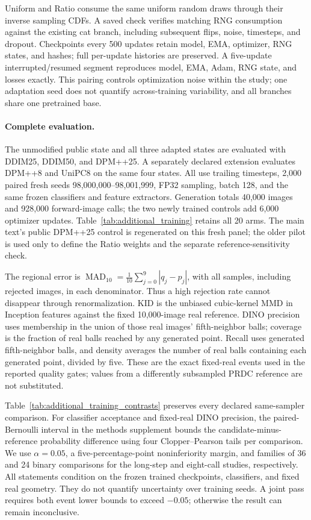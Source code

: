 Uniform and Ratio consume the same uniform random draws through their
inverse sampling CDFs. A saved check verifies matching RNG consumption
against the existing cat branch, including subsequent flips, noise,
timesteps, and dropout. Checkpoints every 500 updates retain model, EMA,
optimizer, RNG states, and hashes; full per-update histories are preserved.
A five-update interrupted/resumed segment reproduces model, EMA, Adam,
RNG state, and losses exactly. This pairing controls optimization noise
within the study; one adaptation seed does not quantify across-training
variability, and all branches share one pretrained base.

\paragraph{Complete evaluation.}
The unmodified public state and all three adapted states are evaluated
with DDIM25, DDIM50, and DPM++25. A separately declared extension evaluates
DPM++8 and UniPC8 on the same four states. All use trailing timesteps,
2,000 paired fresh seeds 98,000,000--98,001,999, FP32 sampling, batch 128,
and the same frozen classifiers and feature extractors. Generation totals
40,000 images and 928,000 forward-image calls; the two newly trained
controls add 6,000 optimizer updates. Table~\ref{tab:additional_training}
retains all 20 arms. The main text's public DPM++25 control is regenerated
on this fresh panel; the older pilot is used only to define the Ratio
weights and the separate reference-sensitivity check.

The regional error is
$\operatorname{MAD}_{10}=\frac{1}{10}\sum_{j=0}^9|q_j-p_j|$,
with all samples, including rejected images, in each denominator.
Thus a high rejection rate cannot disappear through renormalization.
KID is the unbiased cubic-kernel MMD in Inception features against the
fixed 10,000-image real reference. DINO precision uses membership in the
union of those real images' fifth-neighbor balls; coverage is the fraction
of real balls reached by any generated point. Recall uses generated
fifth-neighbor balls, and density averages the number of real balls
containing each generated point, divided by five.
These are the exact fixed-real events used in the reported quality gates;
values from a differently subsampled PRDC reference are not substituted.

Table~\ref{tab:additional_training_contrasts} preserves every declared
same-sampler comparison. For classifier acceptance and fixed-real DINO
precision, the paired-Bernoulli interval in the methods supplement bounds
the candidate-minus-reference probability difference using four
Clopper--Pearson tails per comparison. We use $\alpha=0.05$, a
five-percentage-point noninferiority margin, and families of 36 and 24
binary comparisons for the long-step and eight-call studies, respectively.
All statements condition on the frozen trained checkpoints, classifiers,
and fixed real geometry. They do not quantify uncertainty over training
seeds. A joint pass requires both event lower bounds to exceed $-0.05$;
otherwise the result can remain inconclusive.

